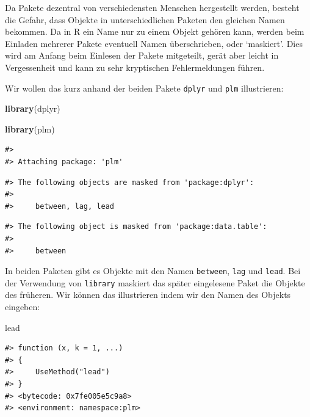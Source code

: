 \documentclass[]{tufte-book}
\newenvironment{Shaded}{}{}
\newcommand{\KeywordTok}[1]{\textcolor[rgb]{0.00,0.44,0.13}{\textbf{#1}}}
\newcommand{\NormalTok}[1]{#1}
\begin{document}
Da Pakete dezentral von verschiedensten Menschen hergestellt werden,
besteht die Gefahr, dass Objekte in unterschiedlichen Paketen den
gleichen Namen bekommen. Da in R ein Name nur zu einem Objekt gehören
kann, werden beim Einladen mehrerer Pakete eventuell Namen
überschrieben, oder `maskiert'. Dies wird am Anfang beim Einlesen der
Pakete mitgeteilt, gerät aber leicht in Vergessenheit und kann zu sehr
kryptischen Fehlermeldungen führen.

Wir wollen das kurz anhand der beiden Pakete \texttt{dplyr} und
\texttt{plm} illustrieren:

\begin{Shaded}
\begin{Highlighting}[]
\KeywordTok{library}\NormalTok{(dplyr)}
\end{Highlighting}
\end{Shaded}

\begin{Shaded}
\begin{Highlighting}[]
\KeywordTok{library}\NormalTok{(plm)}
\end{Highlighting}
\end{Shaded}

\begin{verbatim}
#> 
#> Attaching package: 'plm'
\end{verbatim}

\begin{verbatim}
#> The following objects are masked from 'package:dplyr':
#> 
#>     between, lag, lead
\end{verbatim}

\begin{verbatim}
#> The following object is masked from 'package:data.table':
#> 
#>     between
\end{verbatim}

In beiden Paketen gibt es Objekte mit den Namen \texttt{between},
\texttt{lag} und \texttt{lead}. Bei der Verwendung von \texttt{library}
maskiert das später eingelesene Paket die Objekte des früheren. Wir
können das illustrieren indem wir den Namen des Objekts eingeben:

\begin{Shaded}
\begin{Highlighting}[]
\NormalTok{lead}
\end{Highlighting}
\end{Shaded}

\begin{verbatim}
#> function (x, k = 1, ...) 
#> {
#>     UseMethod("lead")
#> }
#> <bytecode: 0x7fe005e5c9a8>
#> <environment: namespace:plm>
\end{verbatim}
\end{document}
